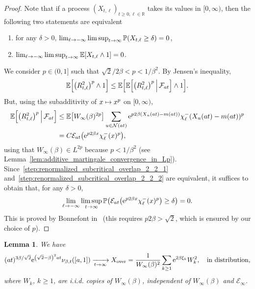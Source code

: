 \documentclass[10pt]{amsart}
\newtheorem{lemm}[theo]{Lemma}\newtheorem{prop}[theo]{Proposition}\newtheorem{coro}[theo]{Corollary}\newtheorem{conj}[theo]{Conjecture}
\theoremstyle{definition}\newtheorem{defi}[theo]{Definition}\newtheorem{rema}[theo]{Remark}\newtheorem{exam}[theo]{Example}\newtheorem{exem}[theo]{Example}\newtheorem{nota}[theo]{Notation}
\newcommand{\rover}{\mathrm{over}}
\newcommand{\e}{\mathrm{e}}
\newcommand{\E}{\mathbb{E}}
\renewcommand{\P}{\mathbb{P}}
\newcommand{\R}{\mathbb{R}}
\newcommand\1{\mathds{1}}
\newcommand{\cE}{\mathcal{E}}
\newcommand{\cF}{\mathcal{F}}
\newcommand{\cN}{\mathcal{N}}
\newcommand{\Expec}[1]{\mathbb{E}\left[#1\right]}
\newcommand*{\relabel}{\renewcommand{\labelenumi}{(\theenumi)}}
\newcommand*{\romanenumi}{\renewcommand*{\theenumi}{\roman{enumi}}\relabel}
\let\originalleft\left
\let\originalright\right
\renewcommand{\left}{\mathopen{}\mathclose\bgroup\originalleft}
\renewcommand{\right}{\aftergroup\egroup\originalright}
\renewcommand*{\to}{\mathchoice{\longrightarrow}{\rightarrow}{\rightarrow}{\rightarrow}}
\let\oldmapsto\mapsto
\renewcommand*{\mapsto}{\mathchoice{\longmapsto}{\oldmapsto}{\oldmapsto}{\oldmapsto}}
\begin{document}
\begin{proof}
Note that if a process $(X_{t, \ell})_{t \geq 0, \ell \in \R}$ takes its values in $[0, \infty)$, then the following two statements are equivalent
\begin{enumerate}\romanenumi
\item\label{step:renormalized_subcritical_overlap_2_2_1}
for any $\delta > 0$, $\lim_{\ell \to -\infty} \limsup_{t \to \infty} \P(X_{t, \ell} \geq \delta) = 0$,
\item\label{step:renormalized_subcritical_overlap_2_2_2}
$\lim_{\ell \to -\infty} \limsup_{t \to \infty} \Expec{X_{t, \ell} \wedge 1} = 0$.
\end{enumerate}
We consider $p \in (0,1]$ such that $\sqrt{2}/2\beta < p < 1/\beta^2$. By Jensen's inequality,
\begin{equation*}
\Expec{\left(R_{t, \ell}^2\right)^p \wedge 1} \leq \Expec{\E \left[\left(R_{t, \ell}^2\right)^p \,\middle|\, \cF_{at} \right] \wedge 1}.
\end{equation*}
But, using the subadditivity of $x \mapsto x^p$ on $[0, \infty)$,
\begin{align*}
\E \left[\left(R_{t, \ell}^2\right)^p \,\middle|\, \cF_{at} \right] & \leq \Expec{W_\infty(\beta)^{2p}} \sum_{u \in \cN(at)} \e^{p2 \beta(X_u(at) - m(at))} \chi_\ell^-(X_u(at) - m(at))^p \\
& = C \cE_{at}\left(\e^{p2 \beta x} \chi_\ell^-(x)^p\right),
\end{align*}
using that $W_\infty(\beta) \in L^{2p}$ because $p < 1/\beta^2$ (see Lemma~\ref{lem:additive_martingale_convergence_in_Lp}). Since~\eqref{step:renormalized_subcritical_overlap_2_2_1} and~\eqref{step:renormalized_subcritical_overlap_2_2_2} are equivalent, it suffices to obtain that, for any $\delta > 0$,
\begin{equation*}
\lim_{\ell \to -\infty} \limsup_{t \to \infty} \P\left(\cE_{at}\left(\e^{p2 \beta x} \chi_\ell^-(x)^p\right) \geq \delta\right) = 0.
\end{equation*}
This is proved by Bonnefont in~\cite[Proposition~A.2]{Bonnefont2022} (this requires $p2\beta > \sqrt{2}$, which is ensured by our choice of $p$).
\end{proof}

\begin{lemm}\label{lem:renormalized_subcritical_overlap_limit}
We have
\begin{equation*}
(at)^{3 \beta/\sqrt{2}} \e^{\left(\sqrt{2} - \beta\right)^2 at} \nu_{\beta, t}([a, 1]) \xrightarrow[t \to \infty]{} X_{\rover} = \frac{1}{W_\infty(\beta)^2} \sum_{k \geq 1} \e^{2 \beta \xi_k} W_k^2, \quad \text{in distribution},
\end{equation*}
where $W_k$, $k \geq 1$, are i.i.d. copies of $W_\infty(\beta)$, independent of $W_\infty(\beta)$ and $\cE_\infty$.
\end{lemm}
\end{document}
